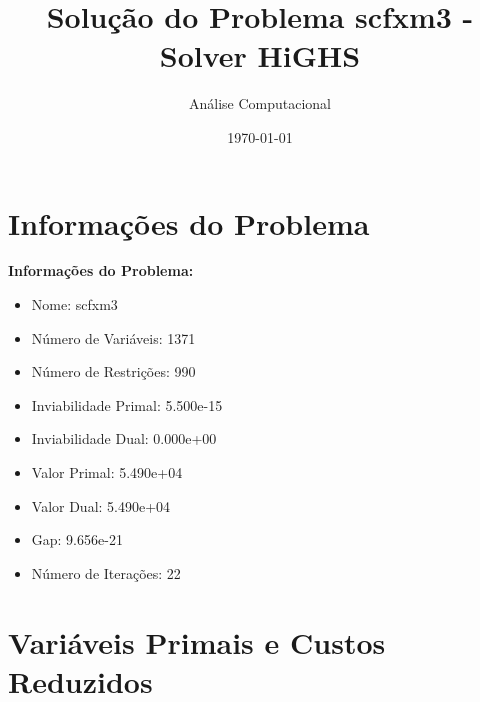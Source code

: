 \documentclass[12pt]{article}
\title{Solução do Problema scfxm3 - Solver HiGHS}
\author{Análise Computacional}
\date{\today}
\begin{document}
\maketitle

\section{Informações do Problema}

\textbf{Informações do Problema:}
\begin{itemize}
\item Nome: scfxm3
\item Número de Variáveis: 1371
\item Número de Restrições: 990
\item Inviabilidade Primal: 5.500e-15
\item Inviabilidade Dual: 0.000e+00
\item Valor Primal: 5.490e+04
\item Valor Dual: 5.490e+04
\item Gap: 9.656e-21
\item Número de Iterações: 22
\end{itemize}


\section{Variáveis Primais e Custos Reduzidos}
\end{document}
